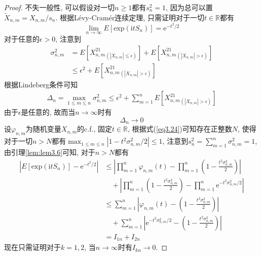 \documentclass[cn, 12pt, math=mtpro2, bibstyle=apa, blue, twocol]{elegantbook}
\newcommand{\R}{\mathbb{R}}
\newcommand{\limn}{\lim_{n\to\infty}}
\begin{document}
\begin{proof}
  不失一般性, 可以假设对一切$n\ge1$都有$s_n^2=1$, 因为总可以置$\tilde{X}_{n,m}=X_{n,m}/s_n$. 根据Lévy-Cramér连续定理, 只需证明对于一切$t\in\R$都有
  $$\limn E[\text{exp}(\text{i}tS_n)]=\text{e}^{-t^2/2}$$
  对于任意的$\epsilon>0$, 注意到
  \begin{align*}
  \sigma_{n,m}^2&=E[X_{n,m}^21_{(|X_{n,m}|\leq\epsilon)}]+E[X_{n,m}^21_{(|X_{n,m}|>\epsilon)}] \\
  &\leq \epsilon^2+E[X_{n,m}^21_{(|X_{n,m}|>\epsilon)}]
  \end{align*}
  根据Lindeberg条件可知
  \begin{align*}
  \Delta_n=\max_{1\leq m\leq n}\sigma_{n,m}^2\leq \epsilon^2+\sum_{m=1}^{n}E[X_{n,m}^21_{(|X_{n,m}|>\epsilon)}]
  \end{align*}
  由于$\epsilon$是任意的, 故而当$n\to\infty$时有
  \begin{equation}\label{eq3.24}
    \Delta_n\to 0
  \end{equation}
  设$\varphi_{n,m}$为随机变量$X_{n,m}$的c.f., 固定$t\in\R$, 根据式(\ref{eq3.24})可知存在正整数$N$, 使得对于一切$n>N$都有$\max_{1\leq m\leq n}|1-t^2\sigma_{n,m}^2/2|\leq 1$, 注意到$s_n^2=\sum_{m=1}^{n}\sigma_{n,m}^2=1$, 由引理\ref{lem:lem3.6}可知, 对于$n>N$都有
  \begin{align*}
  \left|E[\text{exp}(\text{i}tS_n)]-\text{e}^{-t^2/2}\right|&\leq \left|\prod_{m=1}^{n}\varphi_{n,m}(t)-\prod_{m=1}^{n}\left(1-\frac{t^2\sigma_{n,m}^2}{2}\right)\right| \\
  &\quad +\left|\prod_{m=1}^{n}\left(1-\frac{t^2\sigma_{n,m}^2}{2}\right)-\prod_{m=1}^{n}\text{e}^{-t^2\sigma_{n,m}^2/2} \right| \\
  &\leq \sum_{m=1}^{n}\left|\varphi_{n,m}(t)-\left(1-\frac{t^2\sigma_{n,m}^2}{2}\right)\right| \\
  &\quad +\sum_{m=1}^{n}\left|\text{e}^{-t^2\sigma_{n,m}^2/2}-\left(1-\frac{t^2\sigma_{n,m}^2}{2}\right)\right| \\
  &= I_{1n}+I_{2n}
  \end{align*}
  现在只需证明对于$k=1,2$, 当$n\to\infty$时有$I_{kn}\to 0$.


\end{proof}
\end{document}
